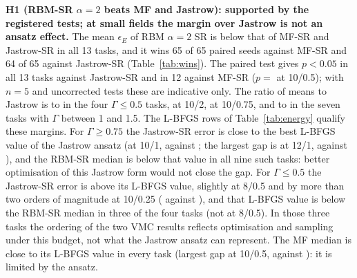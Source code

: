 \textbf{H1 (RBM-SR $\alpha{=}2$ beats MF and Jastrow): supported by the registered tests; at small fields the margin over Jastrow is not an ansatz effect.} The mean $\epsilon_E$ of RBM $\alpha{=}2$ SR is below that of MF-SR and Jastrow-SR in all 13 tasks, and it wins 65 of 65 paired seeds against MF-SR and 64 of 65 against Jastrow-SR (Table~\ref{tab:wins}). The paired test gives $p<0.05$ in all 13 tasks against Jastrow-SR and in 12 against MF-SR ($p=$  at 10/0.5); with $n=5$ and uncorrected tests these are indicative only. The ratio of means to Jastrow is  to  in the four $\Gamma\le0.5$ tasks,  at 10/2,  at 10/0.75, and  to  in the seven tasks with $\Gamma$ between 1 and 1.5. The L-BFGS rows of Table~\ref{tab:energy} qualify these margins. For $\Gamma\ge0.75$ the Jastrow-SR error is close to the best L-BFGS value of the Jastrow ansatz (at 10/1,  against ; the largest gap is at 12/1,  against ), and the RBM-SR median is below that value in all nine such tasks: better optimisation of this Jastrow form would not close the gap. For $\Gamma\le0.5$ the Jastrow-SR error is above its L-BFGS value, slightly at 8/0.5 and by more than two orders of magnitude at 10/0.25 ( against ), and that L-BFGS value is below the RBM-SR median in three of the four tasks (not at 8/0.5). In those three tasks the ordering of the two VMC results reflects optimisation and sampling under this budget, not what the Jastrow ansatz can represent. The MF median is close to its L-BFGS value in every task (largest gap at 10/0.5,  against ): it is limited by the ansatz.

